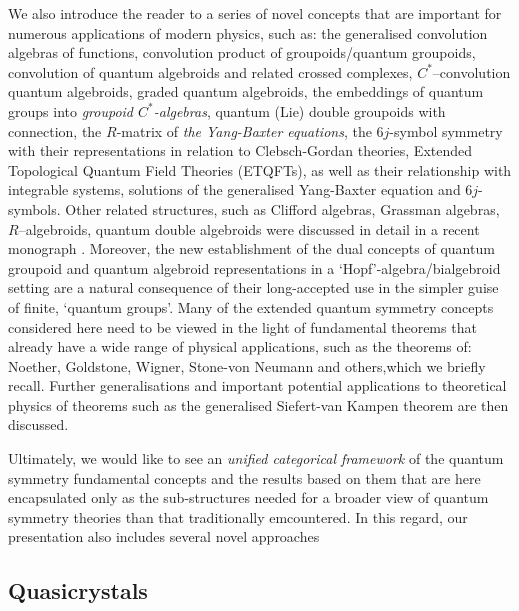 \documentclass[12pt]{article}
\theoremstyle{plain}
\theoremstyle{definition}
\numberwithin{equation}{section}
\begin{document}
We also introduce the reader to a series of novel concepts that are important for numerous applications of modern physics, such as: the generalised convolution algebras of functions, convolution product of groupoids/quantum groupoids, convolution of quantum algebroids and related crossed complexes, $C^*$--convolution quantum algebroids, graded quantum algebroids, the embeddings of quantum groups into \emph{groupoid $C^*$-algebras}, quantum (Lie) double groupoids with connection, the $R$-matrix of \emph{the Yang-Baxter equations}, the $6j$-symbol symmetry with their representations in relation to Clebsch-Gordan theories, Extended Topological Quantum Field Theories (ETQFTs), as well as their relationship with integrable systems, solutions of the generalised Yang-Baxter equation and $6j$-symbols. Other related structures, such as Clifford algebras, Grassman algebras, $R$--algebroids, quantum double algebroids were discussed in detail in a recent monograph \cite{BGB1}. Moreover, the new establishment of the dual concepts of quantum groupoid and quantum algebroid representations in a `Hopf'-algebra/bialgebroid setting are a natural consequence of their long-accepted use in the simpler guise of  finite, `quantum groups'. Many of the extended quantum symmetry concepts considered here need to be viewed in the light of fundamental theorems that already have a wide range of physical applications, such as the theorems of: Noether, Goldstone, Wigner, Stone-von Neumann and others,which we briefly recall. Further generalisations and important potential applications to theoretical physics of theorems such as the generalised Siefert-van Kampen theorem are then discussed.

Ultimately, we would like to see an {\em unified categorical framework} of the quantum symmetry fundamental concepts and the results based on them that are here encapsulated only as the sub-structures needed for a broader view of quantum symmetry theories than that traditionally emcountered. In this regard, our presentation also includes several novel approaches 

\subsection{Quasicrystals}
\end{document}
